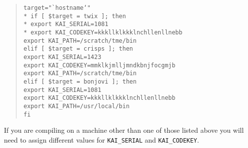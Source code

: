\documentclass[10pt]{nmemo}
\newcommand{\comp}[1]{\normalfont\normalsize\texttt{#1}}
\begin{document}
\begin{verse}
\texttt{target="`hostname`"\\*
     if [ \$target = twix ]; then\\*
\hspace*{0.25in}         export KAI\_SERIAL=1081\\*
\hspace*{0.25in}         export KAI\_CODEKEY=kkkllklkkklnchllenllnebb\\
\hspace*{0.25in}         export KAI\_PATH=/scratch/tme/bin\\
    elif [ \$target = crisps ]; then\\
\hspace*{0.25in}         export KAI\_SERIAL=1423\\
\hspace*{0.25in}         export KAI\_CODEKEY=mmklkjmlljmndkbnjfocgmjb\\
\hspace*{0.25in}         export KAI\_PATH=/scratch/tme/bin\\
    elif [ \$target = bonjovi ]; then\\
\hspace*{0.25in}         export KAI\_SERIAL=1081\\
\hspace*{0.25in}         export KAI\_CODEKEY=kkkllklkkklnchllenllnebb\\
\hspace*{0.25in}         export KAI\_PATH=/usr/local/bin\\
    fi
}
\end{verse}

\normalsize

If you are compiling on a machine other than one of those listed above
you will need to assign different values for \comp{KAI\_SERIAL} and
\comp{KAI\_CODEKEY}.  


\end{document}
